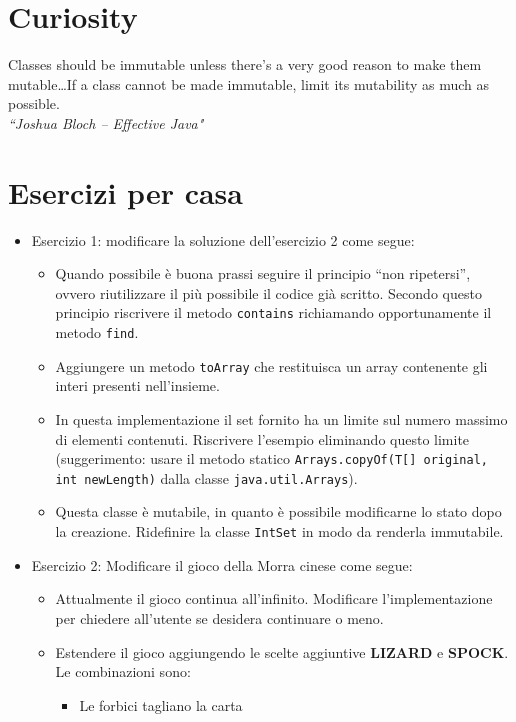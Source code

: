 \documentclass{article}
\begin{document}
\section{Curiosity}
\begin{framed}
Classes should be immutable unless there's a very good reason to make them mutable\ldots If a class cannot be made immutable, limit its mutability as much as possible.\\
\emph{``Joshua Bloch – Effective Java"}
\end{framed}

\section{Esercizi per casa}
\begin{itemize}
\item Esercizio 1: modificare la soluzione dell'esercizio 2 come segue:
\begin{itemize}
	\item Quando possibile è buona prassi seguire il principio ``non ripetersi'', ovvero riutilizzare il più possibile il codice già scritto.
	Secondo questo principio riscrivere il metodo \texttt{contains}
	richiamando opportunamente il metodo \texttt{find}.
	\item Aggiungere un metodo \texttt{toArray} che restituisca un array contenente gli interi presenti nell'insieme.
	\item In questa implementazione il set fornito ha un limite
	sul numero massimo di elementi contenuti.
	Riscrivere l'esempio eliminando questo limite (suggerimento:
	usare il metodo statico \texttt{Arrays.copyOf(T[] original, int newLength)} dalla classe \texttt{java.util.Arrays}).
	\item Questa classe è mutabile, in quanto è possibile modificarne lo stato dopo la creazione. Ridefinire la classe \texttt{IntSet}
	in modo da renderla immutabile.	
\end{itemize}
\item Esercizio 2: Modificare il gioco della Morra cinese come segue:
\begin{itemize}
	\item Attualmente il gioco continua all'infinito. Modificare l'implementazione per chiedere all'utente se desidera continuare o meno.
	\item Estendere il gioco aggiungendo le scelte aggiuntive \textbf{LIZARD} e \textbf{SPOCK}. Le combinazioni sono:
	\begin{itemize}
			\item Le forbici tagliano la carta

\end{itemize}
\end{itemize}
\end{itemize}
\end{document}

